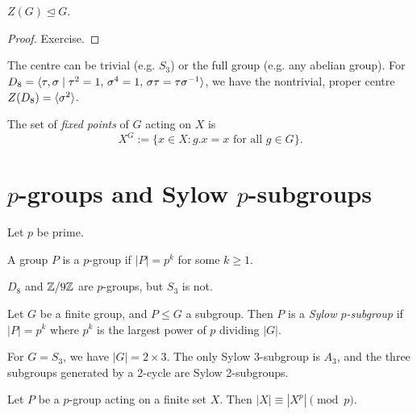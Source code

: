 \begin{proposition}
    $Z(G) \unlhd G$.
\end{proposition}

\begin{proof}
    Exercise.
\end{proof}

\begin{example}
    The centre can be trivial (e.g. $S_3$) or the full group (e.g. any abelian group). For $D_8 = \langle {\tau, \sigma \mid \tau^2 = 1, \, \sigma^4 = 1, \, \sigma \tau = \tau \sigma^{-1}} \rangle$, we have the nontrivial, proper centre $Z(D_8) = \langle {\sigma^2} \rangle$.
\end{example}

\begin{definition}
    The set of \emph{fixed points} of $G$ acting on $X$ is
    \[
        X^G := \{x \in X: g . x = x \text{ for all } g \in G\}.
    \]
\end{definition}

\section{$p$-groups and Sylow $p$-subgroups}

Let $p$ be prime.

\begin{definition}
    A group $P$ is a $p$-group if $|P| = p^k$ for some $k \geq 1$.
\end{definition}

\begin{example}
    $D_8$ and $\mathbb{{Z}}/{{9}}\mathbb{{Z}}$ are $p$-groups, but $S_3$ is not.
\end{example}

\begin{definition}
    Let $G$ be a finite group, and $P \leq G$ a subgroup. Then $P$ is a \emph{Sylow $p$-subgroup} if $|P| = p^k$ where $p^k$ is the largest power of $p$ dividing $|G|$.
\end{definition}

\begin{definition}
    For $G = S_3$, we have $|G| = 2 \times 3$. The only Sylow 3-subgroup is $A_3$, and the three subgroups generated by a 2-cycle are Sylow 2-subgroups.
\end{definition}

\begin{lemma}
    Let $P$ be a $p$-group acting on a finite set $X$. Then $|X| \equiv |X^p| \pmod{p}$.
\end{lemma}

